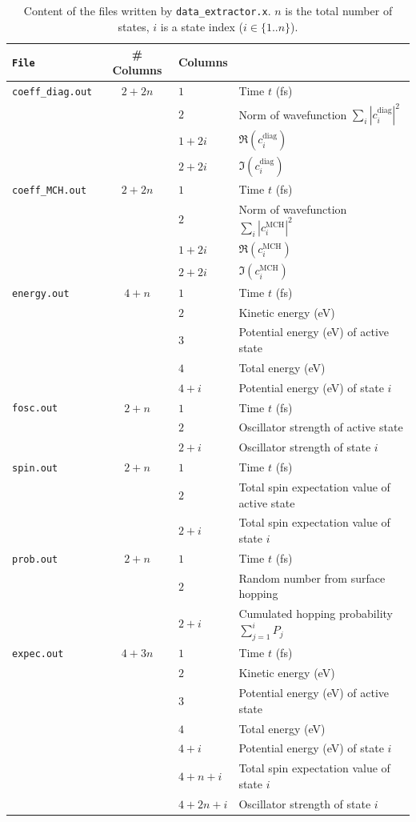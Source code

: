 \documentclass[a4paper,11pt,DIV=15,openany,twoside=false]{scrbook}
\newcommand{\ttt}[1]{\texttt{#1}}
\begin{document}
\begin{table}
  \centering
  \caption{Content of the files written by \ttt{data\_extractor.x}. $n$ is the total number of states, $i$ is a state index ($i\in\{1..n\}$).}
  \label{tab:outputdata}
  \begin{tabular}{>{\tt}lcll}
    \toprule
    File  &\# Columns     &\multicolumn{2}{l}{Columns}\\
    \midrule
    coeff\_diag.out       &$2+2n$
      &$1$ &Time $t$ (fs)\\
      &&$2$ &Norm of wavefunction $\sum_i |c_i^{\text{diag}}|^2$\\
      &&$1+2i$ &$\Re (c_i^{\text{diag}})$\\
      &&$2+2i$ &$\Im (c_i^{\text{diag}})$\\
    coeff\_MCH.out       &$2+2n$
      &$1$ &Time $t$ (fs)\\
      &&$2$ &Norm of wavefunction $\sum_i |c_i^{\text{MCH}}|^2$\\
      &&$1+2i$ &$\Re (c_i^{\text{MCH}})$\\
      &&$2+2i$ &$\Im (c_i^{\text{MCH}})$\\
    energy.out       &$4+n$
      &$1$ &Time $t$ (fs)\\
      &&$2$ &Kinetic energy (eV)\\
      &&$3$ &Potential energy (eV) of active state\\
      &&$4$ &Total energy (eV)\\
      &&$4+i$ &Potential energy (eV) of state $i$\\
    fosc.out       &$2+n$
      &$1$ &Time $t$ (fs)\\
      &&$2$ &Oscillator strength of active state\\
      &&$2+i$ &Oscillator strength of state $i$\\
    spin.out       &$2+n$
      &$1$ &Time $t$ (fs)\\
      &&$2$ &Total spin expectation value of active state\\
      &&$2+i$ &Total spin expectation value of state $i$\\
    prob.out       &$2+n$
      &$1$ &Time $t$ (fs)\\
      &&$2$ &Random number from surface hopping\\
      &&$2+i$ &Cumulated hopping probability $\sum_{j=1}^i P_j$\\
    expec.out      &$4+3n$
      &$1$ &Time $t$ (fs)\\
      &&$2$ &Kinetic energy (eV)\\
      &&$3$ &Potential energy (eV) of active state\\
      &&$4$ &Total energy (eV)\\
      &&$4+i$ &Potential energy (eV) of state $i$\\
      &&$4+n+i$ &Total spin expectation value of state $i$\\
      &&$4+2n+i$ &Oscillator strength of state $i$\\
    \bottomrule
  \end{tabular}
\end{table}
\end{document}
